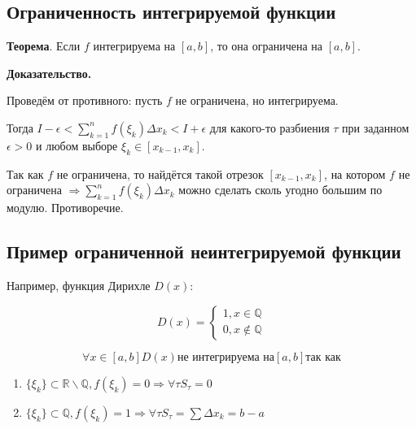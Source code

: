 \documentclass[a4paper]{article}
\begin{document}
\begin{definit}
\subsection*{Ограниченность интегрируемой функции}

\begin{htheorem}\textbf{Теорема}.
Если $f$ интегрируема на $[a,b]$, то она ограничена на $[a,b]$.

\end{htheorem}

\begin{hproof}\textbf{Доказательство.}

Проведём от противного: пусть $f$ не ограничена, но интегрируема.

Тогда $I - \epsilon < \sum_{k=1}^n f(\xi_k) \Delta x_k < I + \epsilon$ для какого-то разбиения $\tau$ при заданном $\epsilon > 0$ и любом выборе $\xi_k \in [x_{k-1}, x_k]$.

Так как $f$ не ограничена, то найдётся такой отрезок $[x_{k-1}, x_k]$, на котором $f$ не ограничена $\Rightarrow \sum_{k=1}^n f(\xi_k) \Delta x_k $ можно сделать сколь угодно большим по модулю. Противоречие.
\end{hproof}

\end{definit}


\begin{definit}
\subsection*{Пример ограниченной неинтегрируемой функции}

Например, функция Дирихле $D(x)$:

\[
	D(x) = \begin{cases}
		1, x \in \mathbb{Q} \\
		0, x \notin \mathbb{Q}
	\end{cases}
\]

\[
	\forall x \in [a,b] D(x) \text{не интегрируема на} [a, b] \text{так как}
\]

\begin{enumerate}
\item $\{ \xi_k \} \subset \mathbb{R} \backslash \mathbb{Q}, f(\xi_k) = 0 \Rightarrow \forall \tau S_\tau = 0$
\item $\{ \xi_k \} \subset \mathbb{Q}, f(\xi_k) = 1 \Rightarrow \forall \tau S_\tau = \sum \Delta x_k = b - a$
\end{enumerate}
\end{definit}
\end{document}
